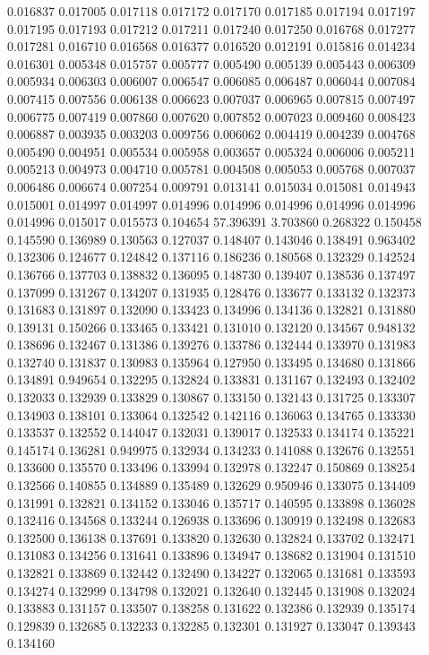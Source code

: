 0.016837
0.017005
0.017118
0.017172
0.017170
0.017185
0.017194
0.017197
0.017195
0.017193
0.017212
0.017211
0.017240
0.017250
0.016768
0.017277
0.017281
0.016710
0.016568
0.016377
0.016520
0.012191
0.015816
0.014234
0.016301
0.005348
0.015757
0.005777
0.005490
0.005139
0.005443
0.006309
0.005934
0.006303
0.006007
0.006547
0.006085
0.006487
0.006044
0.007084
0.007415
0.007556
0.006138
0.006623
0.007037
0.006965
0.007815
0.007497
0.006775
0.007419
0.007860
0.007620
0.007852
0.007023
0.009460
0.008423
0.006887
0.003935
0.003203
0.009756
0.006062
0.004419
0.004239
0.004768
0.005490
0.004951
0.005534
0.005958
0.003657
0.005324
0.006006
0.005211
0.005213
0.004973
0.004710
0.005781
0.004508
0.005053
0.005768
0.007037
0.006486
0.006674
0.007254
0.009791
0.013141
0.015034
0.015081
0.014943
0.015001
0.014997
0.014997
0.014996
0.014996
0.014996
0.014996
0.014996
0.014996
0.015017
0.015573
0.104654
57.396391
3.703860
0.268322
0.150458
0.145590
0.136989
0.130563
0.127037
0.148407
0.143046
0.138491
0.963402
0.132306
0.124677
0.124842
0.137116
0.186236
0.180568
0.132329
0.142524
0.136766
0.137703
0.138832
0.136095
0.148730
0.139407
0.138536
0.137497
0.137099
0.131267
0.134207
0.131935
0.128476
0.133677
0.133132
0.132373
0.131683
0.131897
0.132090
0.133423
0.134996
0.134136
0.132821
0.131880
0.139131
0.150266
0.133465
0.133421
0.131010
0.132120
0.134567
0.948132
0.138696
0.132467
0.131386
0.139276
0.133786
0.132444
0.133970
0.131983
0.132740
0.131837
0.130983
0.135964
0.127950
0.133495
0.134680
0.131866
0.134891
0.949654
0.132295
0.132824
0.133831
0.131167
0.132493
0.132402
0.132033
0.132939
0.133829
0.130867
0.133150
0.132143
0.131725
0.133307
0.134903
0.138101
0.133064
0.132542
0.142116
0.136063
0.134765
0.133330
0.133537
0.132552
0.144047
0.132031
0.139017
0.132533
0.134174
0.135221
0.145174
0.136281
0.949975
0.132934
0.134233
0.141088
0.132676
0.132551
0.133600
0.135570
0.133496
0.133994
0.132978
0.132247
0.150869
0.138254
0.132566
0.140855
0.134889
0.135489
0.132629
0.950946
0.133075
0.134409
0.131991
0.132821
0.134152
0.133046
0.135717
0.140595
0.133898
0.136028
0.132416
0.134568
0.133244
0.126938
0.133696
0.130919
0.132498
0.132683
0.132500
0.136138
0.137691
0.133820
0.132630
0.132824
0.133702
0.132471
0.131083
0.134256
0.131641
0.133896
0.134947
0.138682
0.131904
0.131510
0.132821
0.133869
0.132442
0.132490
0.134227
0.132065
0.131681
0.133593
0.134274
0.132999
0.134798
0.132021
0.132640
0.132445
0.131908
0.132024
0.133883
0.131157
0.133507
0.138258
0.131622
0.132386
0.132939
0.135174
0.129839
0.132685
0.132233
0.132285
0.132301
0.131927
0.133047
0.139343
0.134160

